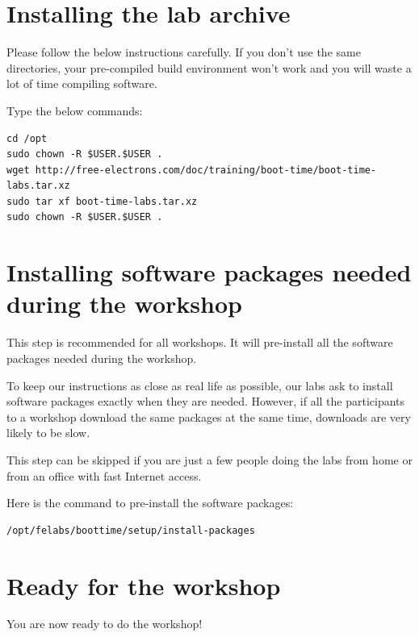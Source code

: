 \section{Installing the lab archive}

Please follow the below instructions carefully. If you don't use the
same directories, your pre-compiled build environment won't work and
you will waste a lot of time compiling software.

Type the below commands:
\begin{verbatim}
cd /opt
sudo chown -R $USER.$USER .
wget http://free-electrons.com/doc/training/boot-time/boot-time-labs.tar.xz
sudo tar xf boot-time-labs.tar.xz
sudo chown -R $USER.$USER .
\end{verbatim}

\section{Installing software packages needed during the workshop}

This step is recommended for all workshops. It will pre-install all the
software packages needed during the workshop.

To keep our instructions as close as real life as possible, our labs
ask to install software packages exactly when they are needed. However,
if all the participants to a workshop download the same packages at the
same time, downloads are very likely to be slow.

This step can be skipped if you are just a few people doing the labs
from home or from an office with fast Internet access.

Here is the command to pre-install the software packages:

\begin{verbatim}
/opt/felabs/boottime/setup/install-packages
\end{verbatim}

\section{Ready for the workshop}

You are now ready to do the workshop!
